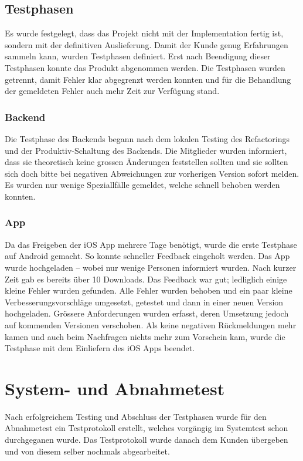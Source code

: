 \subsection{Testphasen}
Es wurde festgelegt, dass das Projekt nicht mit der Implementation fertig ist, sondern mit der definitiven Auslieferung. Damit der Kunde genug Erfahrungen sammeln kann, wurden Testphasen definiert. Erst nach Beendigung dieser Testphasen konnte das Produkt abgenommen werden. Die Testphasen wurden getrennt, damit Fehler klar abgegrenzt werden konnten und für die Behandlung der gemeldeten Fehler auch mehr Zeit zur Verfügung stand.

\subsubsection{Backend}
Die Testphase des Backends begann nach dem lokalen Testing des Refactorings und der Produktiv-Schaltung des Backends. Die Mitglieder wurden informiert, dass sie theoretisch keine grossen Änderungen feststellen sollten und sie sollten sich doch bitte bei negativen Abweichungen zur vorherigen Version sofort melden. Es wurden nur wenige Speziallfälle gemeldet, welche schnell behoben werden konnten.

\subsubsection{App}
Da das Freigeben der iOS App mehrere Tage benötigt, wurde die erste Testphase auf Android gemacht. So konnte schneller Feedback eingeholt werden. Das App wurde hochgeladen -- wobei nur wenige Personen informiert wurden. Nach kurzer Zeit gab es bereits über 10 Downloads. Das Feedback war gut; ledliglich einige kleine Fehler wurden gefunden. Alle Fehler wurden behoben und ein paar kleine Verbesserungsvorschläge umgesetzt, getestet und dann in einer neuen Version hochgeladen. Grössere Anforderungen wurden erfasst, deren Umsetzung jedoch auf kommenden Versionen verschoben. Als keine negativen Rückmeldungen mehr kamen und auch beim Nachfragen nichts mehr zum Vorschein kam, wurde die Testphase mit dem Einliefern des iOS Apps beendet.

\section{System- und Abnahmetest}
Nach erfolgreichem Testing und Abschluss der Testphasen wurde für den Abnahmetest ein Testprotokoll erstellt, welches vorgängig im Systemtest schon durchgeganen wurde. Das Testprotokoll wurde danach dem Kunden übergeben und von diesem selber nochmals abgearbeitet.

